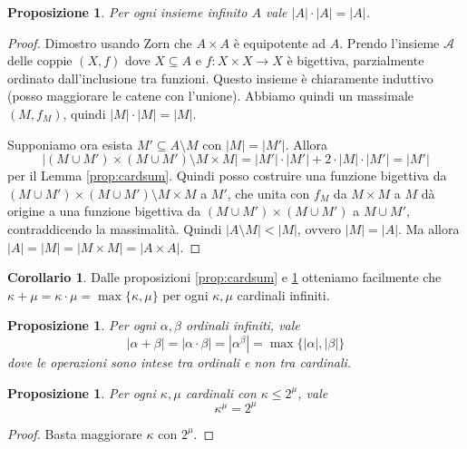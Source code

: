 \documentclass[a4paper,10pt,oneside]{article}
\newcommand{\abs}[1]{\left|#1\right|}
\theoremstyle{plain}
\newtheorem{myprop}[mytheorem]{Proposizione}
\theoremstyle{definition}
\newtheorem{mycor}[mytheorem]{Corollario}
\theoremstyle{remark}
\begin{document}
\begin{myprop}\label{prop:cardprod}
 Per ogni insieme infinito $A$ vale $\abs A \cdot \abs A = \abs A$.
\end{myprop}

\begin{proof}
 Dimostro usando Zorn che $A\times A$ è equipotente ad $A$. Prendo l'insieme $\mathcal A$ delle coppie $(X,f)$ dove $X\subseteq A$ e $f:X\times X\rightarrow X$ è bigettiva, parzialmente ordinato dall'inclusione tra funzioni. Questo insieme è chiaramente induttivo (posso maggiorare le catene con l'unione). Abbiamo quindi un massimale $(M,f_M)$, quindi $\abs M \cdot \abs M=\abs M$.
 
 Supponiamo ora esista $M'\subseteq A\setminus M$ con $\abs M=\abs{M'}$. Allora \[\abs{(M\cup M')\times(M\cup M')\setminus M \times M} = \abs {M'}\cdot \abs{M'} + 2 \cdot \abs{M}\cdot \abs{M'} = \abs {M'}\] per il Lemma \ref{prop:cardsum}. Quindi posso costruire una funzione bigettiva da $(M\cup M')\times(M\cup M')\setminus M \times M$ a $M'$, che unita con $f_M$ da $M\times M$ a $M$ dà origine a una funzione bigettiva da $(M\cup M')\times(M\cup M')$ a $M \cup M'$, contraddicendo la massimalità. Quindi $\abs {A\setminus M}< \abs M$, ovvero $\abs M= \abs A$. Ma allora $\abs A = \abs M = \abs{M\times M} = \abs {A \times A}$.
\end{proof}

\begin{mycor}
 Dalle proposizioni \ref{prop:cardsum} e \ref{prop:cardprod} otteniamo facilmente che $\kappa + \mu = \kappa \cdot \mu = \max\{\kappa, \mu\}$ per ogni $\kappa,\mu$ cardinali infiniti.
\end{mycor}


\begin{myprop}
 Per ogni $\alpha,\beta$ ordinali infiniti, vale 
 \[ \left|\alpha+\beta\right|=\left|\alpha\cdot\beta\right|=\left|\alpha^\beta\right|=\max\{|\alpha|,|\beta|\}\]
 dove le operazioni sono intese tra ordinali e non tra cardinali.
\end{myprop}

\begin{myprop}
 Per ogni $\kappa, \mu$ cardinali con $\kappa \le 2^\mu$, vale \[\kappa^\mu=2^\mu\] 
\end{myprop}
\begin{proof} 
  Basta maggiorare $\kappa$ con $2^\mu$.
\end{proof}
\end{document}
